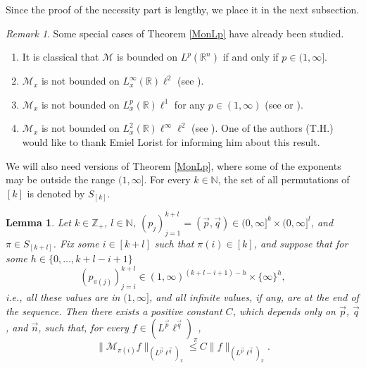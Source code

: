 \documentclass[11pt, reqno]{amsart}
\newtheorem{lemma}[theorem]{Lemma}
\theoremstyle{definition}
\theoremstyle{remark}
\newtheorem{remark}[theorem]{Remark}
\numberwithin{equation}{section}
\newcommand{\vn}{\vec n}
\newcommand{\vp}{\vec p}
\newcommand{\vq}{\vec q}
\newcommand{\Norm}[2]{\|#1\|_{#2}}
\begin{document}
Since the proof of the necessity part is lengthy,
we place it in the next subsection.

\begin{remark}
Some special cases of Theorem \ref{MonLp} have already been studied.
\begin{enumerate}[\rm(i)]
\item
It is classical that $\mathcal M$ is bounded on $L^p(\mathbb R^n)$
if and only if $p\in(1,\infty]$.

\item
$\mathcal M_x$ is not bounded on $L^\infty_x(\mathbb R)\ell^2$ (see \cite[Remark 2.9]{GMT93}).

\item
$\mathcal M_x$ is not bounded on $L^p_x(\mathbb R)\ell^1$ for any $p\in(1,\infty)$
(see \cite[Proposition 2.4]{GMT93} or \cite[p.\,75, Section 5.1]{Ste93}).

\item
$\mathcal M_x$ is not bounded on $L^2_x(\mathbb R)\ell^\infty\ell^2$
(see \cite[Proposition 8.1]{NVW15}).
One of the authors (T.H.) would like to thank
Emiel Lorist for informing him about this result.
\end{enumerate}
\end{remark}


We will also need versions of Theorem \ref{MonLp},
where some of the exponents may be outside the range $(1,\infty]$.
For every $k\in\mathbb N$,
the set of all permutations of $[k]$ is denoted by $S_{[k]}$.

\begin{lemma}\label{Fefferman Stein}
Let $k\in\mathbb Z_+$, $l\in\mathbb N$, $(p_j)_{j=1}^{k+l}
=(\vp,\vq)\in(0,\infty]^k\times(0,\infty]^{l}$,
and $\pi\in S_{[k+l]}$.
Fix some $i\in[k+l]$ such that $\pi(i)\in[k]$,
and suppose that for some $h\in\{0,\ldots,k+l-i+1\}$
\begin{equation}\label{>1 infty at end}
(p_{\pi(j)})_{j=i}^{k+l}\in(1,\infty)^{(k+l-i+1)-h}\times\{\infty\}^{h},
\end{equation}
i.e., all these values are in $(1,\infty]$, and all infinite values, if any, are at the end of the sequence.
Then there exists a positive constant $C$,
which depends only on $\vp$, $\vq$, and $\vn$, such that,
for every $f\in(L^{\vp}\ell^{\vq})_\pi$,
\begin{equation*}
\Norm{ \mathcal M_{\pi(i)}f }{(L^{\vp}\ell^{\vq})_\pi}
\le C  \Norm{ f }{(L^{\vp}\ell^{\vq})_\pi}.
\end{equation*}
\end{lemma}
\end{document}
